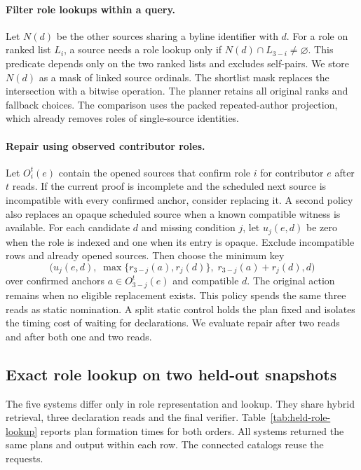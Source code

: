 \paragraph{Filter role lookups within a query.}
Let $N(d)$ be the other sources sharing a byline identifier with $d$.
For a role on ranked list $L_i$, a source needs a role lookup only if
$N(d)\cap L_{3-i}\ne\varnothing$. This predicate depends only on the
two ranked lists and excludes self-pairs. We store $N(d)$ as a mask of
linked source ordinals. The shortlist mask replaces the intersection
with a bitwise operation. The planner retains all original ranks and
fallback choices. The comparison uses the packed repeated-author
projection, which already removes roles of single-source identities.

\paragraph{Repair using observed contributor roles.}
Let $O_i^t(e)$ contain the opened sources that confirm role $i$ for contributor $e$ after $t$ reads. If the current proof is incomplete and the scheduled next source is incompatible with every confirmed anchor, consider replacing it. A second policy also replaces an opaque scheduled source when a known compatible witness is available. For each candidate $d$ and missing condition $j$, let $u_j(e,d)$ be zero when the role is indexed and one when its entry is opaque. Exclude incompatible rows and already opened sources. Then choose the minimum key
\begin{equation}
\bigl(u_j(e,d),\;
\max\{r_{3-j}(a),r_j(d)\},\;
r_{3-j}(a)+r_j(d),d\bigr)
\label{eq:repair}
\end{equation}
over confirmed anchors $a\in O^t_{3-j}(e)$ and compatible $d$. The original action remains when no eligible replacement exists. This policy spends the same three reads as static nomination. A split static control holds the plan fixed and isolates the timing cost of waiting for declarations. We evaluate repair after two reads and after both one and two reads.

\subsection{Exact role lookup on two held-out snapshots}
The five systems differ only in role representation and lookup.
They share hybrid retrieval, three declaration reads and the final
verifier. Table~\ref{tab:held-role-lookup} reports plan formation
times for both orders. All systems returned the same plans and
output within each row. The connected catalogs reuse the requests.


